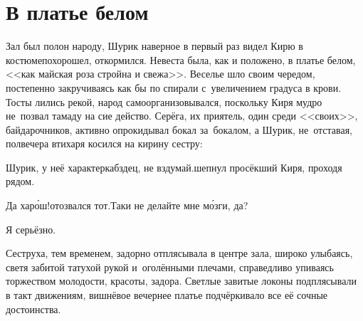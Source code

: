 {
\chapter{В платье белом}
\vepsianrose

\fancyhead[LE]{\fancyplain{}{\bfseries \parttitle}}
\fancyhead[RO]{\fancyplain{}{\bfseries \rightmark}}

Зал был полон народу, Шурик наверное в первый раз видел Кирю в костюме\mdash похорошел, откормился. Невеста была, как и положено, в платье белом, <<как майская роза стройна и свежа>>. Веселье шло своим чередом, постепенно закручиваясь как бы по спирали с~увеличением градуса в крови. Тосты лились рекой, народ самоорганизовывался, поскольку Киря мудро не~позвал тамаду на сие действо. Серёга, их приятель, один среди <<своих>>, байдарочников, активно опрокидывал бокал за~бокалом, а Шурик, не~отставая, полвечера втихаря косился на кирину сестру:

\diagdash Шурик, у неё характер\mdash кабздец, не вздумай.\mdash шепнул просёкший Киря, проходя рядом. 

\diagdash Да хар\'{о}ш!\mdash отозвался тот.\mdash Таки не делайте мне м\'{о}зги, да?

\diagdash Я серьёзно.

Сеструха, тем временем, задорно отплясывала в центре зала, широко улыбаясь, светя забитой татухой рукой и~оголёнными плечами, справедливо упиваясь торжеством молодости, красоты, задора. Светлые завитые локоны подплясывали в такт движениям, вишнёвое вечернее платье подчёркивало все её сочные достоинства.

%
%
%

\noindent
\begin{minipage}{0.48\textwidth}
	\setlength{\parindent}{1.0cm}  %
	

\end{minipage}}
